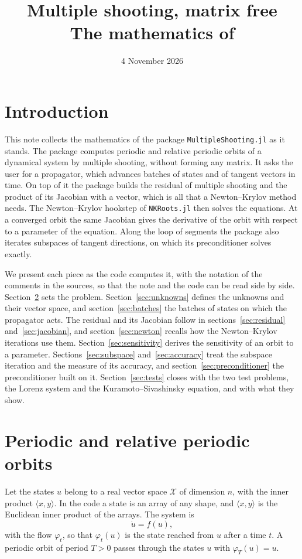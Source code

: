 \documentclass[11pt,a4paper]{article}
\title{Multiple shooting, matrix free\\[0.3em]
\large The mathematics of \code{MultipleShooting.jl}}
\author{}
\date{4 November 2026}
\newcommand{\X}{\mathcal{X}}
\newcommand{\ip}[2]{\langle #1, #2\rangle}
\newcommand{\code}[1]{\texttt{#1}}
\begin{document}
\maketitle

\section{Introduction}

This note collects the mathematics of the package \code{MultipleShooting.jl} as it stands. The
package computes periodic and relative periodic orbits of a dynamical system by multiple shooting,
without forming any matrix. It asks the user for a propagator, which advances batches of states and
of tangent vectors in time. On top of it the package builds the residual of multiple shooting and
the product of its Jacobian with a vector, which is all that a Newton--Krylov method needs. The
Newton--Krylov hookstep of \code{NKRoots.jl} then solves the equations. At a converged orbit the
same Jacobian gives the derivative of the orbit with respect to a parameter of the equation. Along
the loop of segments the package also iterates subspaces of tangent directions, on which its
preconditioner solves exactly.

We present each piece as the code computes it, with the notation of the comments in the sources,
so that the note and the code can be read side by side. Section~\ref{sec:setting} sets the problem.
Section~\ref{sec:unknowns} defines the unknowns and their vector space, and
section~\ref{sec:batches} the batches of states on which the propagator acts. The residual and its
Jacobian follow in sections~\ref{sec:residual} and~\ref{sec:jacobian}, and
section~\ref{sec:newton} recalls how the Newton--Krylov iterations use them.
Section~\ref{sec:sensitivity} derives the sensitivity of an orbit to a parameter.
Sections~\ref{sec:subspace} and~\ref{sec:accuracy} treat the subspace iteration and the measure of
its accuracy, and section~\ref{sec:preconditioner} the preconditioner built on it. Section~\ref{sec:tests} closes with the two test problems, the Lorenz system and the
Kuramoto--Sivashinsky equation, and with what they show.

\section{Periodic and relative periodic orbits}
\label{sec:setting}

Let the states $u$ belong to a real vector space $\X$ of dimension $n$, with the inner product
$\ip{x}{y}$. In the code a state is an array of any shape, and $\ip{x}{y}$ is the Euclidean inner
product of the arrays. The system is
\begin{equation}
  \dot u = f(u),
\end{equation}
with the flow $\varphi_t$, so that $\varphi_t(u)$ is the state reached from $u$ after a time $t$.
A periodic orbit of period $T > 0$ passes through the states $u$ with $\varphi_T(u) = u$.
\end{document}
